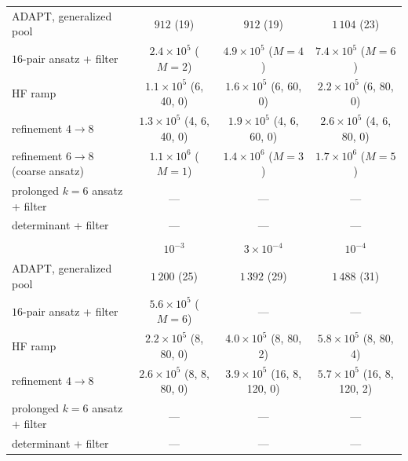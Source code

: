\documentclass[
  aps,            %
  prc,            %
  reprint,        %
  superscriptaddress,
  floatfix,
  nofootinbib
]{revtex4-2}
\begin{document}
\begin{table}[t]
\begin{ruledtabular}
\begin{tabular}{lccc}
ADAPT, generalized pool & $912$ (19) & $912$ (19) & $1\,104$ (23)\\
$16$-pair ansatz + filter & $2.4\times10^{5}$ ($M{=}2$) & $4.9\times10^{5}$ ($M{=}4$) & $7.4\times10^{5}$ ($M{=}6$)\\
HF ramp & $1.1\times10^{5}$ (6, 40, 0) & $1.6\times10^{5}$ (6, 60, 0) & $2.2\times10^{5}$ (6, 80, 0)\\
refinement $4\to8$ & $1.3\times10^{5}$ (4, 6, 40, 0) & $1.9\times10^{5}$ (4, 6, 60, 0) & $2.6\times10^{5}$ (4, 6, 80, 0)\\
refinement $6\to8$ (coarse ansatz) & $1.1\times10^{6}$ ($M{=}1$) & $1.4\times10^{6}$ ($M{=}3$) & $1.7\times10^{6}$ ($M{=}5$)\\
prolonged $k{=}6$ ansatz + filter & --- & --- & ---\\
determinant + filter & --- & --- & ---\\
\colrule
\multicolumn{4}{l}{$k=8$, $N=8$, $g=2$ ($\delta t=0.05$, $\sigma=1.5$, cycle $9.1\times10^{4}$ CNOTs)} \\
 & $10^{-3}$ & $3\times10^{-4}$ & $10^{-4}$\\
ADAPT, generalized pool & $1\,200$ (25) & $1\,392$ (29) & $1\,488$ (31)\\
$16$-pair ansatz + filter & $5.6\times10^{5}$ ($M{=}6$) & --- & ---\\
HF ramp & $2.2\times10^{5}$ (8, 80, 0) & $4.0\times10^{5}$ (8, 80, 2) & $5.8\times10^{5}$ (8, 80, 4)\\
refinement $4\to8$ & $2.6\times10^{5}$ (8, 8, 80, 0) & $3.9\times10^{5}$ (16, 8, 120, 0) & $5.7\times10^{5}$ (16, 8, 120, 2)\\
prolonged $k{=}6$ ansatz + filter & --- & --- & ---\\
determinant + filter & --- & --- & ---\\
\end{tabular}
\end{ruledtabular}
\end{table}
\end{document}
